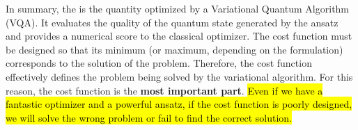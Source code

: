 \highspace
In summary, the  is the quantity optimized by a Variational Quantum Algorithm (VQA). It evaluates the quality of the quantum state generated by the ansatz and provides a numerical score to the classical optimizer. The cost function must be designed so that its minimum (or maximum, depending on the formulation) corresponds to the solution of the problem. Therefore, the cost function effectively defines the problem being solved by the variational algorithm. For this reason, the cost function is the \textbf{most important part}. \hl{Even if we have a fantastic optimizer and a powerful ansatz, if the cost function is poorly designed, we will solve the wrong problem or fail to find the correct solution.}